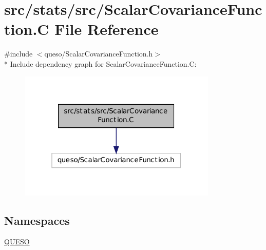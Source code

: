 \hypertarget{_scalar_covariance_function_8_c}{\section{src/stats/src/\-Scalar\-Covariance\-Function.C File Reference}
\label{_scalar_covariance_function_8_c}
}
{\ttfamily \#include $<$queso/\-Scalar\-Covariance\-Function.\-h$>$}\\*
Include dependency graph for Scalar\-Covariance\-Function.\-C\-:
\nopagebreak
\begin{figure}[H]
\begin{center}
\leavevmode
\includegraphics[width=268pt]{_scalar_covariance_function_8_c__incl}
\end{center}
\end{figure}
\subsection*{Namespaces}
\begin{DoxyCompactItemize}
\item 
\hyperlink{namespace_q_u_e_s_o}{Q\-U\-E\-S\-O}
\end{DoxyCompactItemize}
